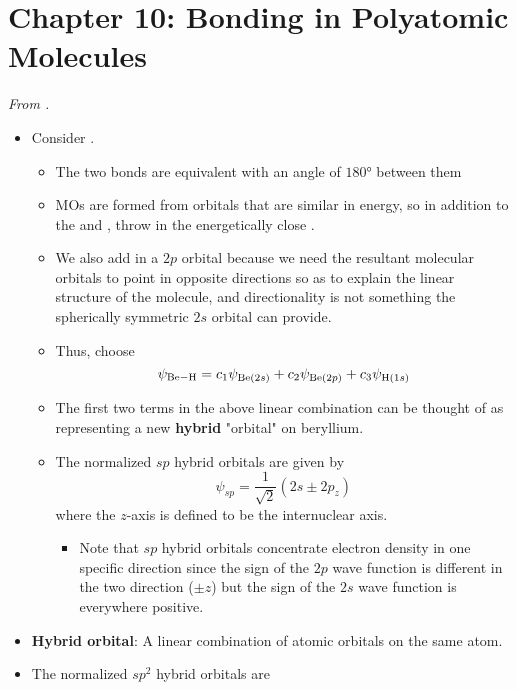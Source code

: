 \documentclass[../notes.tex]{subfiles}
\begin{document}
\section{Chapter 10: Bonding in Polyatomic Molecules}
\emph{From \textcite{bib:McQuarrieSimon}.}
\begin{itemize}
    \item {}Consider .
    \begin{itemize}
        \item The two  bonds are equivalent with an angle of $\ang{180}$ between them
        \item MOs are formed from orbitals that are similar in energy, so in addition to the  and , throw in the energetically close .
        \item We also add in a $2p$ orbital because we need the resultant molecular orbitals to point in opposite directions so as to explain the linear structure of the molecule, and directionality is not something the spherically symmetric $2s$ orbital can provide.
        \item Thus, choose
        \begin{equation*}
            \psi_{\ce{Be-H}} = c_1\psi_{\ce{Be($2s$)}}+c_2\psi_{\ce{Be($2p$)}}+c_3\psi_{\ce{H($1s$)}}
        \end{equation*}
        \item The first two terms in the above linear combination can be thought of as representing a new \textbf{hybrid} "orbital" on beryllium.
        \item The normalized $sp$ hybrid orbitals are given by
        \begin{equation*}
            \psi_{sp} = \frac{1}{\sqrt{2}}(2s\pm 2p_z)
        \end{equation*}
        where the $z$-axis is defined to be the internuclear  axis.
        \begin{itemize}
            \item Note that $sp$ hybrid orbitals concentrate electron density in one specific direction since the sign of the $2p$ wave function is different in the two direction ($\pm z$) but the sign of the $2s$ wave function is everywhere positive.
        \end{itemize}
    \end{itemize}
    \item \textbf{Hybrid orbital}: A linear combination of atomic orbitals on the same atom.
    \item The normalized $sp^2$ hybrid orbitals are

\end{itemize}
\end{document}
